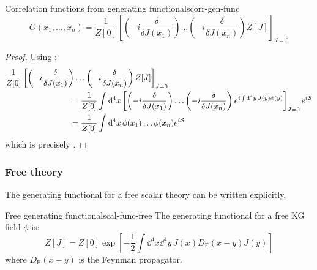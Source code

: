 \begin{lemma}[before upper = {\tcbtitle}]{Correlation functions from generating functionals}{corr-gen-func}
  \begin{equation}
    G(x_1, \dots, x_n) = \frac{1}{Z[0]} \left[ \left( -i \frac{\delta}{\delta J(x_1)} \right) \dots \left( -i \frac{\delta}{\delta J(x_n)} \right) Z[J] \right]_{J = 0}
  \end{equation}
\end{lemma}

\begin{proofbox}
  \begin{proof}
    Using :
    \begin{equation*}
      \begin{split}
        & \frac{1}{Z[0]} \left[ \left( -i \frac{\delta}{\delta J(x_1)} \right) \dots \left( -i \frac{\delta}{\delta J(x_n)} \right) Z[J] \right]_{J = 0} \\
        & \qquad \qquad \qquad \qquad = \frac{1}{Z[0]} \int \mathrm{d}^4x \left[ \left( -i \frac{\delta}{\delta J(x_1)} \right) \dots \left( -i \frac{\delta}{\delta J(x_n)} \right) e^{i \int \mathrm{d}^4y\, J(y) \phi(y)} \right]_{J = 0} e^{i\mathcal{S}} \\
        & \qquad \qquad \qquad \qquad = \frac{1}{Z[0]} \int \mathrm{d}^4x\, \phi(x_1) \dots \phi(x_n) e^{i\mathcal{S}}
      \end{split}
    \end{equation*}
    which is precisely .
  \end{proof}
\end{proofbox}

\subsubsection{Free theory}

The generating functional for a free scalar theory can be written explicitly.

\begin{proposition}{Free generating functional}{scal-func-free}
  The generating functional for a free KG field $ \phi $ is:
  \begin{equation}
    Z[J] = Z[0] \exp \left[ -\frac{1}{2} \int \dd^4x \dd^4y\, J(x) D_\text{F}(x-y) J(y) \right]
    \label{eq:func-free}
  \end{equation}
  where $ D_\text{F}(x-y) $ is the Feynman propagator.
\end{proposition}

